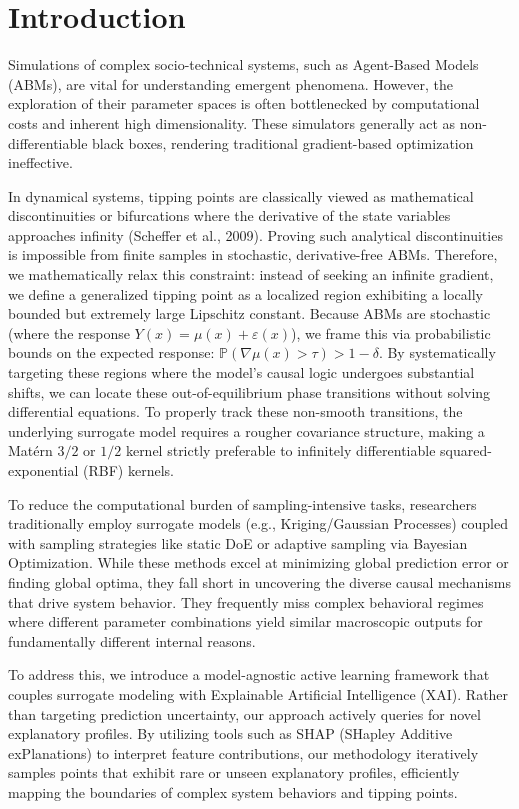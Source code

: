 \documentclass[sn-mathphys]{sn-jnl}
\theoremstyle{thmstyleone}%
\theoremstyle{thmstyletwo}%
\theoremstyle{thmstylethree}%
\begin{document}
\tableofcontents

\section{Introduction}
Simulations of complex socio-technical systems, such as Agent-Based Models (ABMs), are vital for understanding emergent phenomena. However, the exploration of their parameter spaces is often bottlenecked by computational costs and inherent high dimensionality. These simulators generally act as non-differentiable black boxes, rendering traditional gradient-based optimization ineffective. 

In dynamical systems, tipping points are classically viewed as mathematical discontinuities or bifurcations where the derivative of the state variables approaches infinity (Scheffer et al., 2009). Proving such analytical discontinuities is impossible from finite samples in stochastic, derivative-free ABMs. Therefore, we mathematically relax this constraint: instead of seeking an infinite gradient, we define a generalized tipping point as a localized region exhibiting a locally bounded but extremely large Lipschitz constant. Because ABMs are stochastic (where the response $Y(x) = \mu(x) + \varepsilon(x)$), we frame this via probabilistic bounds on the expected response: $\mathbb{P}(\nabla \mu(x) > \tau) > 1 - \delta$. By systematically targeting these regions where the model's causal logic undergoes substantial shifts, we can locate these out-of-equilibrium phase transitions without solving differential equations. To properly track these non-smooth transitions, the underlying surrogate model requires a rougher covariance structure, making a Matérn $3/2$ or $1/2$ kernel strictly preferable to infinitely differentiable squared-exponential (RBF) kernels.

To reduce the computational burden of sampling-intensive tasks, researchers traditionally employ surrogate models (e.g., Kriging/Gaussian Processes) coupled with sampling strategies like static DoE or adaptive sampling via Bayesian Optimization. While these methods excel at minimizing global prediction error or finding global optima, they fall short in uncovering the diverse causal mechanisms that drive system behavior. They frequently miss complex behavioral regimes where different parameter combinations yield similar macroscopic outputs for fundamentally different internal reasons.

To address this, we introduce a model-agnostic active learning framework that couples surrogate modeling with Explainable Artificial Intelligence (XAI). Rather than targeting prediction uncertainty, our approach actively queries for novel explanatory profiles. By utilizing tools such as SHAP (SHapley Additive exPlanations) to interpret feature contributions, our methodology iteratively samples points that exhibit rare or unseen explanatory profiles, efficiently mapping the boundaries of complex system behaviors and tipping points.
\end{document}
